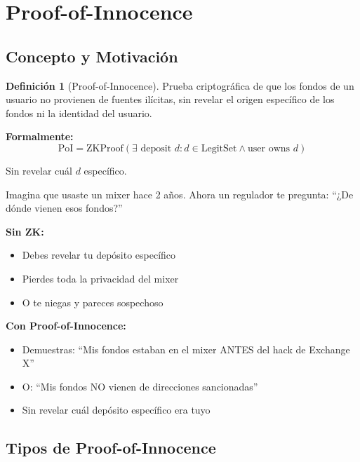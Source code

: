 \documentclass[11pt,a4paper,twoside]{book}
\theoremstyle{definition}
\newtheorem{definition}{Definición}[chapter]
\theoremstyle{remark}
\begin{document}
\section{Proof-of-Innocence}
\label{sec:proof-of-innocence}

\subsection{Concepto y Motivación}

\begin{definition}[Proof-of-Innocence]
Prueba criptográfica de que los fondos de un usuario no provienen de fuentes ilícitas, sin revelar el origen específico de los fondos ni la identidad del usuario.

\textbf{Formalmente:}
\[
\text{PoI} = \text{ZKProof}\left(\exists \text{ deposit } d : d \in \text{LegitSet} \land \text{user owns } d\right)
\]

Sin revelar cuál $d$ específico.
\end{definition}

\begin{intuicion}
Imagina que usaste un mixer hace 2 años. Ahora un regulador te pregunta: ``¿De dónde vienen esos fondos?''

\textbf{Sin ZK:}
\begin{itemize}
    \item Debes revelar tu depósito específico
    \item Pierdes toda la privacidad del mixer
    \item O te niegas y pareces sospechoso
\end{itemize}

\textbf{Con Proof-of-Innocence:}
\begin{itemize}
    \item Demuestras: ``Mis fondos estaban en el mixer ANTES del hack de Exchange X''
    \item O: ``Mis fondos NO vienen de direcciones sancionadas''
    \item Sin revelar cuál depósito específico era tuyo
\end{itemize}
\end{intuicion}

\subsection{Tipos de Proof-of-Innocence}
\end{document}

